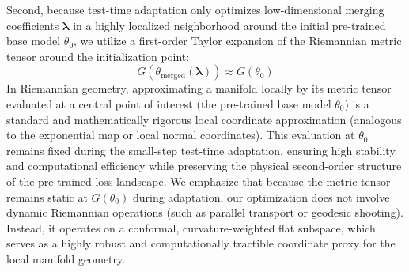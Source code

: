 Second, because test-time adaptation only optimizes low-dimensional merging coefficients $\boldsymbol{\lambda}$ in a highly localized neighborhood around the initial pre-trained base model $\theta_0$, we utilize a first-order Taylor expansion of the Riemannian metric tensor around the initialization point:
\begin{equation}
\label{eq:taylor_metric}
G(\theta_{\text{merged}}(\boldsymbol{\lambda})) \approx G(\theta_0)
\end{equation}
In Riemannian geometry, approximating a manifold locally by its metric tensor evaluated at a central point of interest (the pre-trained base model $\theta_0$) is a standard and mathematically rigorous local coordinate approximation (analogous to the exponential map or local normal coordinates). This evaluation at $\theta_0$ remains fixed during the small-step test-time adaptation, ensuring high stability and computational efficiency while preserving the physical second-order structure of the pre-trained loss landscape. We emphasize that because the metric tensor remains static at $G(\theta_0)$ during adaptation, our optimization does not involve dynamic Riemannian operations (such as parallel transport or geodesic shooting). Instead, it operates on a conformal, curvature-weighted flat subspace, which serves as a highly robust and computationally tractible coordinate proxy for the local manifold geometry.

